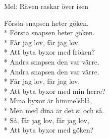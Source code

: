 \begin{SongText}
    \begin{SongInfo}
        Mel: Räven raskar över isen
    \end{SongInfo}
    \begin{SongVerse}
        Första snapsen heter göken.\\*%
        Första snapsen heter göken.\\*%
        Får jag lov, får jag lov,\\*%
        Att byta byxor med fröken?\\*%
        Andra snapsen den var värre.\\*%
        Andra snapsen den var värre.\\*%
        Får jag lov, får jag lov,\\*%
        Att byta byxor med min herre?\\*%
        Mina byxor är himmelsblå,\\*%
        Men med dina är det si och så.\\*%
        Så, får jag lov, får jag lov,\\*%
        Att byta byxor med göken?
    \end{SongVerse}
\end{SongText}
